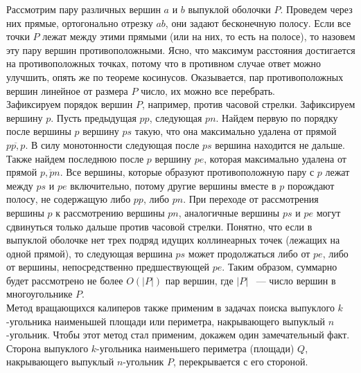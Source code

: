 Рассмотрим пару различных вершин $a$ и $b$ выпуклой оболочки $P$. Проведем
через них прямые, ортогонально отрезку $ab$, они задают бесконечную
полосу. Если все точки $P$ лежат
между этими прямыми (или на них, то есть на полосе),
то назовем эту пару вершин противоположными.
Ясно, что максимум расстояния достигается на противоположных точках,
потому что в противном случае ответ можно улучшить, опять же
по теореме косинусов.
Оказывается, пар противоположных вершин линейное от размера $P$ число,
их можно все перебрать.\\
Зафиксируем порядок вершин $P$, например, против часовой стрелки. Зафиксируем
вершину $p$. Пусть предыдущая $pp$, следующая $pn$. Найдем первую
по порядку после вершины $p$ вершину $ps$ такую, что она максимально
удалена от прямой $\overline{pp,p}$.
В силу монотонности следующая после $ps$ вершина
находится не дальше. Также найдем последнюю после $p$ вершину $pe$,
которая максимально удалена от прямой $\overline{p,pn}$.
Все вершины, которые образуют
противоположную пару с $p$ лежат между $ps$ и $pe$ включительно,
потому другие вершины вместе в $p$ порождают полосу, не содержащую
либо $pp$, либо $pn$. При переходе от рассмотрения вершины $p$ к рассмотрению
вершины $pn$, аналогичные вершины $ps$ и $pe$ могут сдвинуться
только дальше против часовой стрелки. Понятно, что если в выпуклой
оболочке нет трех подряд идущих коллинеарных точек (лежащих на одной прямой),
то следующая вершина $ps$ может продолжаться либо от $pe$, либо от вершины,
непосредственно предшествующей $pe$. Таким образом, суммарно
будет рассмотрено не более $O(|P|)$ пар вершин,
где $|P|$ ~--- число вершин в многоугольнике $P$.\\

Метод вращающихся калиперов также применим в задачах поиска выпуклого
$k$-угольника наименьшей площади или периметра, накрывающего выпуклый
$n$-угольник. Чтобы этот метод стал применим,
докажем один замечательный факт.\\

Сторона выпуклого $k$-угольника наименьшего периметра (площади) $Q$,
накрывающего выпуклый $n$-угольник $P$, перекрывается с его стороной.\\

